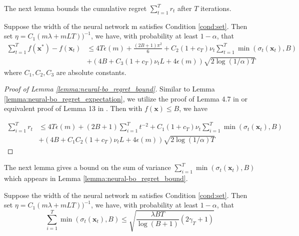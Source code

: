 The next lemma bounds the cumulative regret $\sum_{t=1}^T r_t$ after $T$ iterations. 
\begin{lemma}
\label{lemma:neural-bo_regret_bound}
Suppose the width of the neural network m satisfies Condition \ref{cond:set}. Then set $\eta = C_1(m\lambda + mLT))^{-1}$, we have, with probability at least $1-\alpha$, that
\begin{equation*}
\begin{split}
   \sum_{t=1}^T f(\mathbf{x^*}) - f(\mathbf{x}_t)
    & \leq  4T \epsilon(m) + \frac{(2B+1)\pi^2}{6} + C_2(1+c_T)\nu_t \sum^T_{t=1} \min(\sigma_t(\mathbf{x}_t),B) \\ &
    + (4B+ C_3 (1+c_T)\nu_t L + 4\epsilon(m)) \sqrt{2 \log(1/\alpha)T}
\end{split}
\end{equation*}
where $C_1, C_2, C_3$ are absolute constants.
\end{lemma}
\begin{proof}[Proof of Lemma \ref{lemma:neural-bo_regret_bound}]
    

Similar to Lemma \ref{lemma:neural-bo_regret_expectation}, we utilize the proof of Lemma 4.7 in \citet{zhang2021neural} or equivalent proof of Lemma 13 in \citet{chowdhury2017kernelized}. Then with $f(\mathbf{x})\leq B$, we have

\begin{equation*}
\begin{split}
    \sum_{i=1}^T r_t & \leq 4T\epsilon(m) + (2B+1) \sum_{i=1}^T t^{-2} + C_1 (1+c_T)\nu_t\sum_{i=1}^T \min(\sigma_t(\mathbf{x}_t),B) \\ & + (4B + C_1C_2(1 + c_T )\nu_t L + 4\epsilon(m))\sqrt{2 \log(1/\alpha)T}
\end{split} 
\end{equation*}
\end{proof}
The next lemma gives a bound on the sum of variance $\sum_{i=1}^T \min(\sigma_t(\mathbf{x}_t), B)$ which appears in Lemma \ref{lemma:neural-bo_regret_bound}.
\begin{lemma}
\label{lemma:neural-bo_min_sigma}
Suppose the width of the neural network m satisfies Condition \ref{cond:set}. Then set $\eta = C_1(m\lambda + mLT))^{-1}$, we have, with probability at least $1-\alpha$, that
\begin{equation*}
    \sum_{i=1}^T \min(\sigma_t(\mathbf{x}_t),B) \leq \sqrt{\frac{\lambda BT}{\log(B+1)} (2\gamma_T+1) } 
\end{equation*}
\end{lemma}
